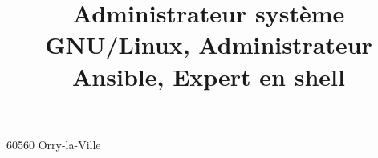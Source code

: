 \title{Administrateur système GNU/Linux, Administrateur Ansible, Expert en shell}

\usepackage{fontawesome5}
\providecommand*{\gitlabsocialsymbol}{}
\renewcommand*{\gitlabsocialsymbol}{{\scriptsize\faGitlab}~}

\address{4 Impasse de la ferme}{60560 Orry-la-Ville}
